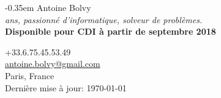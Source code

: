 \documentclass[]{resume-openfont}
\begin{document}
\noindent%
\begin{minipage}{.5\textwidth}
\kern-0.35em
{
  \fontsize{28pt}{28pt}
  \selectfont Antoine Bolvy\\
}
\textit{ ans, passionné d'informatique, solveur de problèmes.}\\
\textbf{Disponible pour CDI à partir de septembre 2018}
\vspace{5pt}


\end{minipage}%
\begin{minipage}{.5\textwidth}
\begin{flushright}
\color{headings}+33.6.75.45.53.49\\
\href{mailto:antoine.bolvy@gmail.com}{antoine.bolvy@gmail.com}\\
Paris, France\\
{\color{date}\fontsize{7pt}{12pt}\selectfont{}Dernière mise à jour: \today}
\end{flushright}
\end{minipage}

\noindent\makebox[\linewidth]{
{\color{headingsrulegray}\rule{\paperwidth}{0.4pt}}}
\vspace{-18pt}

%
%
\end{document}
